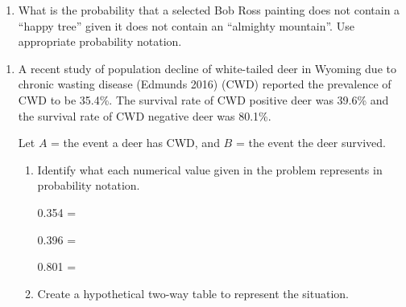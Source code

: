 \documentclass[
]{report}
\providecommand{\tightlist}{%
  \setlength{\itemsep}{0pt}\setlength{\parskip}{0pt}}
\begin{document}
\vspace{0.5in}

\begin{enumerate}
\def\labelenumi{\alph{enumi}.}
\setcounter{enumi}{2}
\tightlist
\item
  What is the probability that a selected Bob Ross painting does not contain a ``happy tree'' given it does not contain an ``almighty mountain''. Use appropriate probability notation.
\end{enumerate}

\vspace{0.55in}

\newpage

\begin{enumerate}
\def\labelenumi{\arabic{enumi}.}
\setcounter{enumi}{1}
\item
  A recent study of population decline of white-tailed deer in Wyoming due to chronic wasting disease (Edmunds 2016) (CWD) reported the prevalence of CWD to be 35.4\%. The survival rate of CWD positive deer was 39.6\% and the survival rate of CWD negative deer was 80.1\%.\\
  \vspace{1mm}

  Let \(A\) = the event a deer has CWD, and \(B\) = the event the deer survived.
  \vspace{0.1in}

  \begin{enumerate}
  \def\labelenumii{\alph{enumii}.}
  \item
    Identify what each numerical value given in the problem represents in probability notation.
    \vspace{.1in}

    0.354 =\\
    \vspace{.1in}

    0.396 =\\
    \vspace{.1in}

    0.801 =\\
    \vspace{.1in}
  \item
    Create a hypothetical two-way table to represent the situation.
  \end{enumerate}
\end{enumerate}
\end{document}
